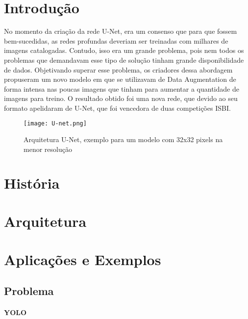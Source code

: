 \documentclass[conference]{IEEEtran}
\begin{document}
\section{Introdução}
No momento da criação da rede U-Net, era um consenso que para que fossem bem-sucedidas, as redes profundas deveriam ser treinadas com milhares de imagens catalogadas. Contudo, isso era um grande problema, pois nem todos os problemas que demandavam esse tipo de solução tinham grande disponibilidade de dados. Objetivando superar esse problema, os criadores dessa abordagem propuseram um novo modelo em que se utilizavam de Data Augmentation de forma intensa nas poucas imagens que tinham para aumentar a quantidade de imagens para treino. O resultado obtido foi uma nova rede, que devido ao seu formato apelidaram de U-Net, que foi vencedora de duas competições ISBI.

\begin{figure}[h]
    \centering
    \texttt{[image: U-net.png]}
    \caption{Arquitetura U-Net, exemplo para um modelo com 32x32 pixels na menor resolução}
    \label{fig:U_Net}
\end{figure}


\section{História}


\section{Arquitetura}

\section{Aplicações e Exemplos}

\subsection{Problema}

\paragraph{YOLO}




\begin{thebibliography}{00}
\end{thebibliography}
\vspace{12pt}
\end{document}
